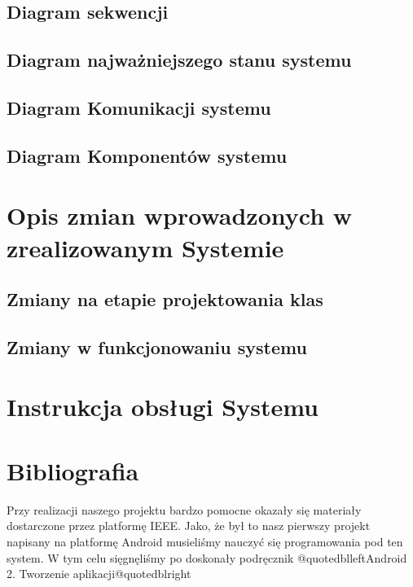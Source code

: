 \documentclass[11pt,a4paper]{article}
\begin{document}
\subsection {Diagram sekwencji}
\subsection {Diagram najważniejszego stanu systemu}
\subsection {Diagram Komunikacji systemu}
\subsection {Diagram Komponentów systemu}

\section {Opis zmian wprowadzonych w zrealizowanym Systemie }
\subsection {Zmiany na etapie projektowania klas}
\subsection {Zmiany w funkcjonowaniu systemu}

\section {Instrukcja obsługi Systemu}

\section{Bibliografia}
Przy realizacji naszego projektu bardzo pomocne okazały się materiały dostarczone przez platformę IEEE.
\cite{2009UltraDeponti}
\cite{2010ComputingEttinger}
\cite{2011IEEEIntGoldman}
\cite{2011IEEERadioMitchell}
\cite{2009IEEEEngineeringSposaro}
\cite{2011DroidColunas}
\cite{2010IEEEEMBCDoukas}
\cite{2010IEEEEMBCSposaro}
\cite{2009IEEEBIBEWang}
\cite{2010NISSYang}
Jako, że był to nasz pierwszy projekt napisany na platformę Android musieliśmy nauczyć się programowania pod ten system. W tym celu sięgnęliśmy po doskonały podręcznik @quotedblleft{}Android 2. Tworzenie aplikacji@quotedblright{} \cite{2010AndroidHashimi}



\end{document}
